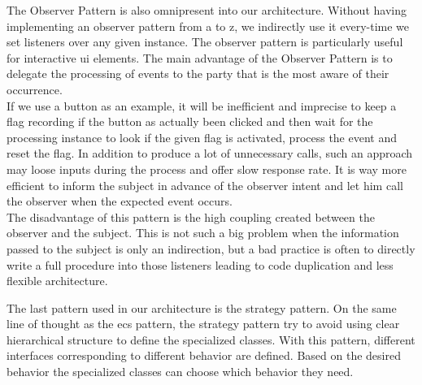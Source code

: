 The Observer Pattern is also omnipresent into our architecture. Without having implementing an observer pattern from a to z, we indirectly use it every-time we set listeners over any given instance. The observer pattern is particularly useful for interactive \gls{ui} elements. The main advantage of the Observer Pattern is to delegate the processing of events to the party that is the most aware of their occurrence. \\

If we use a button as an example, it will be inefficient and imprecise to keep a flag recording if the button as actually been clicked and then wait for the processing instance to look if the given flag is activated, process the event and reset the flag. In addition to produce a lot of unnecessary calls, such an approach may loose inputs during the process and offer slow response rate. It is way more efficient to inform the subject in advance of the observer intent and let him call the observer when the expected event occurs. \\

The disadvantage of this pattern is the high coupling created between the observer and the subject. This is not such a big problem when the information passed to the subject is only an indirection, but a bad practice is often to directly write a full procedure into those listeners leading to code duplication and less flexible architecture. \cite{wiki:observer}

The last pattern used in our architecture is the strategy pattern. On the same line of thought as the \gls{ecs} pattern, the strategy pattern try to avoid using clear hierarchical structure to define the specialized classes. With this pattern, different interfaces corresponding to different behavior are defined. Based on the desired behavior the specialized classes can choose which behavior they need. \cite{wiki:strategy} \\
